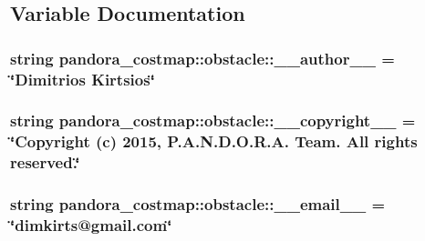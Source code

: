 \subsection{\-Variable \-Documentation}
\hypertarget{namespacepandora__costmap_1_1obstacle_a908a01b680a6a10b14c450b79a23eded}{
\subsubsection[{\-\_\-\-\_\-author\-\_\-\-\_\-}]{\setlength{\rightskip}{0pt plus 5cm}string {\bf pandora\-\_\-costmap\-::obstacle\-::\-\_\-\-\_\-author\-\_\-\-\_\-} = \char`\"{}\-Dimitrios \-Kirtsios\char`\"{}}}\label{namespacepandora__costmap_1_1obstacle_a908a01b680a6a10b14c450b79a23eded}
\hypertarget{namespacepandora__costmap_1_1obstacle_ada373277c4883191238e4bc9339d4d4d}{
\subsubsection[{\-\_\-\-\_\-copyright\-\_\-\-\_\-}]{\setlength{\rightskip}{0pt plus 5cm}string {\bf pandora\-\_\-costmap\-::obstacle\-::\-\_\-\-\_\-copyright\-\_\-\-\_\-} = \char`\"{}\-Copyright (c) 2015, \-P.\-A.\-N.\-D.\-O.\-R.\-A. \-Team. \-All rights reserved.\char`\"{}}}\label{namespacepandora__costmap_1_1obstacle_ada373277c4883191238e4bc9339d4d4d}
\hypertarget{namespacepandora__costmap_1_1obstacle_a57ac392439b8ce36b8dc6457ed5fb5aa}{
\subsubsection[{\-\_\-\-\_\-email\-\_\-\-\_\-}]{\setlength{\rightskip}{0pt plus 5cm}string {\bf pandora\-\_\-costmap\-::obstacle\-::\-\_\-\-\_\-email\-\_\-\-\_\-} = \char`\"{}dimkirts@gmail.\-com\char`\"{}}}\label{namespacepandora__costmap_1_1obstacle_a57ac392439b8ce36b8dc6457ed5fb5aa}
